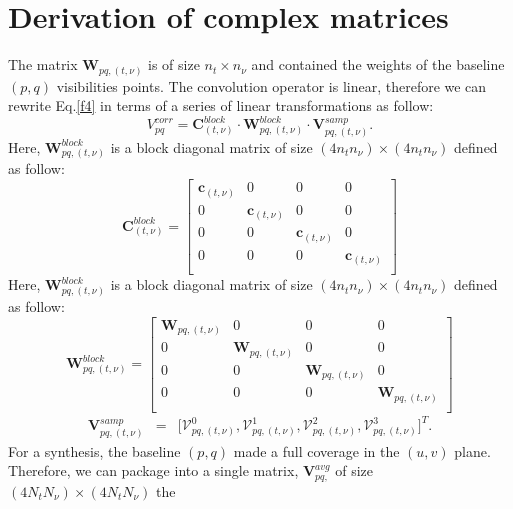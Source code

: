 \documentclass[useAMS,usenatbib]{mn2e}
\begin{document}
\section[]{Derivation of complex matrices}
The matrix $\mathcal{\textbf{W}}_{pq,(t,\nu)}$ is of size $n_t \times n_{\nu}$ and contained the weights of the baseline $(p,q)$ 
visibilities points.
The convolution operator is linear, therefore we can rewrite Eq.\ref{f4} in terms of a series of linear transformations as follow:
\begin{equation}
V_{pq}^{corr}= \mathbf{C}_{(t,\nu)}^{block}\cdot\mathbf{W}_{pq,(t,\nu)}^{block}\cdot \mathbf{V}_{pq,(t,\nu)}^{samp}.
\end{equation}
Here, $\mathbf{W}_{pq,(t,\nu)}^{block}$ is a block diagonal matrix of size $(4n_t n_{\nu})\times(4n_t n_{\nu})$ defined as follow:
\begin{equation*}
\mathbf{C}_{(t,\nu)}^{block}=
  \begin{bmatrix}
    \mathbf{c}_{(t,\nu)} & 0 & 0 & 0\\
    0 &  \mathbf{c}_{(t,\nu)} &0 & 0 \\
    0 & 0 & \mathbf{c}_{(t,\nu)} & 0\\
      0 & 0 & 0 & \mathbf{c}_{(t,\nu)}\\
  \end{bmatrix}
\end{equation*}
Here, $\mathbf{W}_{pq,(t,\nu)}^{block}$ is a block diagonal matrix of size $(4n_t n_{\nu})\times(4n_t n_{\nu})$ defined as follow:
\begin{equation*}
\mathbf{W}_{pq,(t,\nu)}^{block}=
  \begin{bmatrix}
    \mathbf{W}_{pq,(t,\nu)}& 0 & 0 & 0\\
    0 &  \mathbf{W}_{pq,(t,\nu)} &0 & 0 \\
    0 & 0 & \mathbf{W}_{pq,(t,\nu)} & 0\\
      0 & 0 & 0 & \mathbf{W}_{pq,(t,\nu)}\\
  \end{bmatrix}
\end{equation*}
\begin{eqnarray*}
\mathbf{V}_{pq,(t,\nu)}^{samp}&=&\Bigg[\mathcal{V}_{pq,(t,\nu)}^{0},\mathcal{ V } 
^1_{pq,(t,\nu)},\mathcal{V}^2_{pq,(t,\nu)},\mathcal{V}_{pq,(t,\nu)}^{3 } \Bigg]^T. 
\end{eqnarray*}
For a synthesis, the baseline $(p,q)$ made a full coverage in the $(u,v)$ plane. Therefore, we can  
package into a single matrix, $\mathbf{V}_{pq,}^{avg}$ of size $(4N_t N_{\nu})\times (4N_t N_{\nu})$ the 
\end{document}
